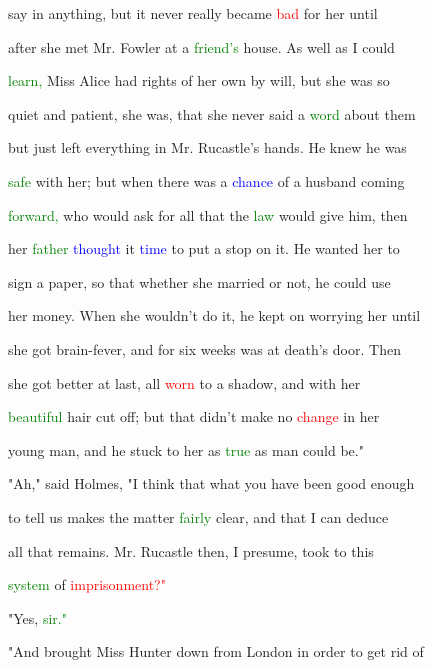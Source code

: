  say in anything, but it never really became \textcolor{red}{bad} for her until

 after she met Mr. Fowler at a \textcolor{green}{friend's} house. As well as I could

 \textcolor{green}{learn,} Miss Alice had rights of her own by will, but she was so

 \textcolor{BurntOrange}{quiet} and \textcolor{BurntOrange}{patient,} she was, that she never said a \textcolor{green}{word} about them

 but just left everything in Mr. Rucastle's hands. He knew he was

 \textcolor{green}{safe} with her; but when there was a \textcolor{blue}{chance} of a husband coming

 \textcolor{green}{forward,} who would ask for all that the \textcolor{green}{law} would give him, then

 her \textcolor{green}{father} \textcolor{blue}{thought} it \textcolor{blue}{time} to put a stop on it. He wanted her to

 sign a paper, so that whether she married or not, he could use

 her \textcolor{BurntOrange}{money.} When she wouldn't do it, he kept on \textcolor{BurntOrange}{worrying} her until

 she got brain-fever, and for six weeks was at \textcolor{BurntOrange}{death's} door. Then

 she got better at last, all \textcolor{red}{worn} to a shadow, and with her

 \textcolor{green}{beautiful} hair cut off; but that didn't make no \textcolor{red}{change} in her

 \textcolor{BurntOrange}{young} man, and he stuck to her as \textcolor{green}{true} as man could be."



 "Ah," said Holmes, "I think that what you have been \textcolor{BurntOrange}{good} enough

 to tell us makes the matter \textcolor{green}{fairly} clear, and that I can deduce

 all that \textcolor{BurntOrange}{remains.} Mr. Rucastle then, I presume, took to this

 \textcolor{green}{system} of \textcolor{red}{imprisonment?"}



 "Yes, \textcolor{green}{sir."}



 "And brought Miss \textcolor{BurntOrange}{Hunter} down from London in order to get rid of

